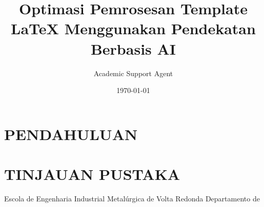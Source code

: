 \documentclass{EEIMVR}
\title{Optimasi Pemrosesan Template LaTeX Menggunakan Pendekatan Berbasis AI}
\author{Academic Support Agent}
\date{\today}
\begin{document}
\maketitle

\begin{abstract}

\end{abstract}

\chapter{PENDAHULUAN}


\chapter{TINJAUAN PUSTAKA}



\usepackage{lipsum}
\usepackage[frame=no,font=sans]{EEIMVRformat} %

\usepackage[alf, abnt-repeated-author-omit=no, abnt-emphasize = bf, abnt-full-initials=no, abnt-thesis-year=final]{abntex2cite}








\areadeconcentracao{} %

            {} %
            {Escola de Engenharia Industrial Metalúrgica de Volta Redonda} %
            {Departamento de \UFFcurso}
\end{document}
